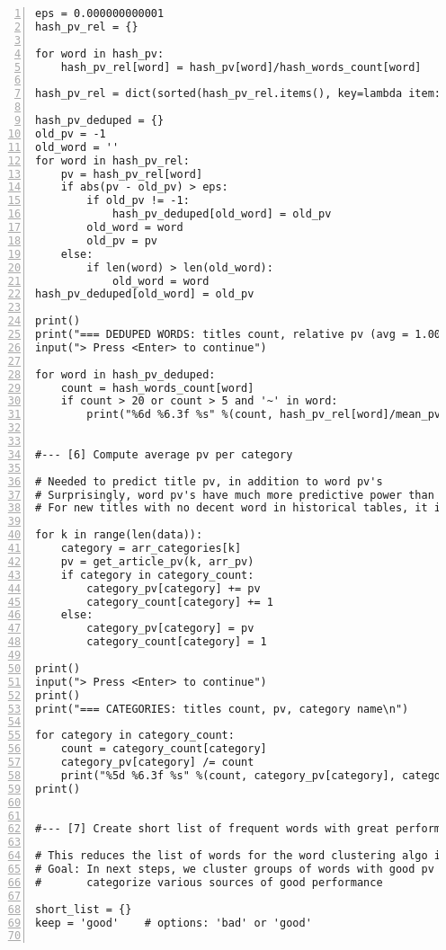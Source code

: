 \documentclass[oneside,10pt]{book}
\begin{document}
\begin{lstlisting}[numbers=left]
eps = 0.000000000001
hash_pv_rel = {}

for word in hash_pv:
    hash_pv_rel[word] = hash_pv[word]/hash_words_count[word]

hash_pv_rel = dict(sorted(hash_pv_rel.items(), key=lambda item: item[1], reverse=True))

hash_pv_deduped = {}
old_pv = -1
old_word = ''
for word in hash_pv_rel:
    pv = hash_pv_rel[word]
    if abs(pv - old_pv) > eps:
        if old_pv != -1:
            hash_pv_deduped[old_word] = old_pv 
        old_word = word
        old_pv = pv
    else:
        if len(word) > len(old_word):
            old_word = word
hash_pv_deduped[old_word] = old_pv

print()
print("=== DEDUPED WORDS: titles count, relative pv (avg = 1.00), word\n")
input("> Press <Enter> to continue")

for word in hash_pv_deduped: 
    count = hash_words_count[word]
    if count > 20 or count > 5 and '~' in word:
        print("%6d %6.3f %s" %(count, hash_pv_rel[word]/mean_pv, word))


#--- [6] Compute average pv per category

# Needed to predict title pv, in addition to word pv's
# Surprisingly, word pv's have much more predictive power than category pv's
# For new titles with no decent word in historical tables, it is very useful

for k in range(len(data)):
    category = arr_categories[k]
    pv = get_article_pv(k, arr_pv)
    if category in category_count: 
        category_pv[category] += pv
        category_count[category] += 1
    else:
        category_pv[category] = pv
        category_count[category] = 1

print()
input("> Press <Enter> to continue")
print()
print("=== CATEGORIES: titles count, pv, category name\n")

for category in category_count:
    count = category_count[category]
    category_pv[category] /= count
    print("%5d %6.3f %s" %(count, category_pv[category], category)) 
print()


#--- [7] Create short list of frequent words with great performance

# This reduces the list of words for the word clustering algo in next step
# Goal: In next steps, we cluster groups of words with good pv to
#       categorize various sources of good performance

short_list = {}
keep = 'good'    # options: 'bad' or 'good'


\end{lstlisting}
\end{document}
